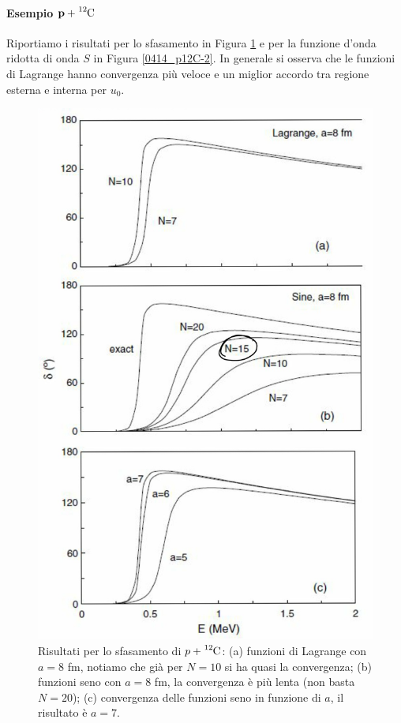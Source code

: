 \paragraph{Esempio $\mathbf{p+\ce{^{12}C}}$} Riportiamo i risultati per lo sfasamento in Figura \ref{0414_p12C} e per la funzione d'onda ridotta di onda $S$ in Figura \ref{0414_p12C-2}. In generale si osserva che le funzioni di Lagrange hanno convergenza più veloce e un miglior accordo tra regione esterna e interna per $u_0$.
\begin{figure}[h]
	\centering
	\includegraphics[scale=0.2]{Immagini/0414_metodi.png}
	\caption{Risultati per lo sfasamento di $p+\ce{^{12}C}$: (a) funzioni di Lagrange con $a=8$ fm, notiamo che già per $N=10$ si ha quasi la convergenza; (b) funzioni seno con $a=8$ fm, la convergenza è più lenta (non basta $N=20$); (c) convergenza delle funzioni seno in funzione di $a$, il risultato è $a=7$.}
	\label{0414_p12C}
\end{figure}
